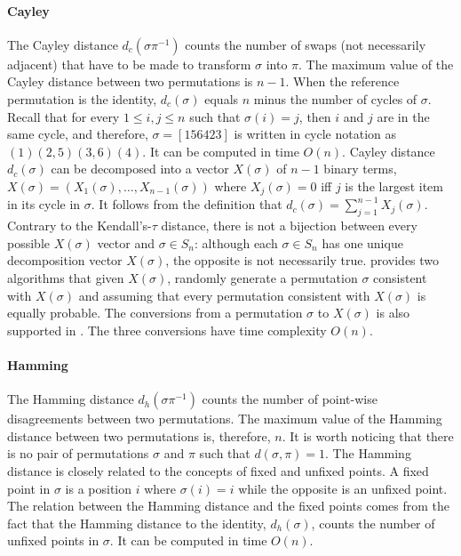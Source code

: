 \documentclass[article,nojss]{jss}
\begin{document}
\paragraph{Cayley}
The Cayley distance $d_c(\sigma\pi^{-1})$ counts the number of swaps (not necessarily adjacent) that have to be made to transform $\sigma$ into $\pi$. The maximum value of the Cayley distance between two permutations is $n-1$. When the reference permutation is the identity, $d_c(\sigma)$ equals $n$ minus the number of cycles of $\sigma$. Recall that for every $1\leq i,j\leq n$ such that $\sigma(i)=j$, then $i$ and $j$ are in the same cycle, and therefore, $\sigma=[156423]$ is written in cycle notation as $(1) (2,5) (3,6) (4)$. It can be computed in time $O(n)$. Cayley distance $d_c(\sigma)$ can be decomposed into a vector $X(\sigma)$ of $n-1$ binary terms,  $X(\sigma)= (X_1(\sigma), \ldots, X_{n-1}(\sigma))$ where $X_j(\sigma) = 0 $ iff $j$ is the largest item in its cycle in $\sigma$. It follows from the definition that $d_c(\sigma) = \sum_{j=1}^{n-1} X_j(\sigma)$. Contrary to the Kendall's-$\tau$ distance, there is not a bijection between every possible $X(\sigma)$ vector and $\sigma \in S_n$: although each $\sigma \in S_n$ has one unique decomposition vector $X(\sigma)$, the opposite is not necessarily true. \citep{Irurozki2014b} provides two algorithms that given $X(\sigma)$, randomly generate a permutation $\sigma$ consistent with $X(\sigma)$ and assuming that every permutation consistent with $X(\sigma)$ is equally probable. The conversions from a permutation $\sigma$ to  $X(\sigma)$ is also supported in . The three conversions have time complexity $O(n)$.

\paragraph{Hamming}
The Hamming distance $d_h(\sigma\pi^{-1})$ counts the number of point-wise disagreements between two permutations. The maximum value of the Hamming distance between two permutations is, therefore, $n$. It is worth noticing that there is no pair of permutations $\sigma$ and $\pi$ such that $d(\sigma , \pi)=1$. The Hamming distance is closely related to the concepts of fixed and unfixed points. A fixed point in $\sigma$ is a position $i$ where $\sigma(i) = i $ while the opposite is an unfixed point. The relation between the Hamming distance and the fixed points comes from the fact that the Hamming distance to the identity, $d_h(\sigma)$, counts the number of unfixed points in $\sigma$. It can be computed in time $O(n)$.
\end{document}
